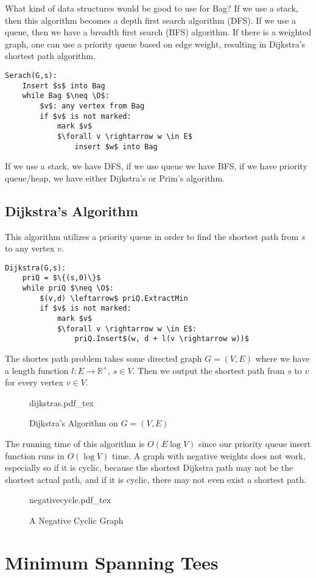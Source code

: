\documentclass{article}
\newcommand{\incfig}[1]{%
    \def\svgwidth{.5\linewidth}
    {#1.pdf_tex}
}
\theoremstyle{definition}
\begin{document}
What kind of data structures would be good to use for Bag? If 
we use a stack, then this algorithm becomes a depth first search algorithm (DFS).
If we use a queue, then we have a breadth first search (BFS) algorithm.
If there is a weighted graph, one can use a priority queue based on edge weight,
resulting in Dijkstra's shortest path algorithm.
\begin{lstlisting}[mathescape=true]
Serach(G,s):
    Insert $s$ into Bag
    while Bag $\neq \O$:
        $v$: any vertex from Bag
        if $v$ is not marked:
            mark $v$
            $\forall v \rightarrow w \in E$
                insert $w$ into Bag
\end{lstlisting}
If we use a stack, we have DFS, if we use queue we have BFS, if we have priority queue/heap, we have
either Dijkstra's or Prim's algorithm.
\subsection*{Dijkstra's Algorithm}
This algorithm utilizes a priority queue in order to find the shortest path from $s$
to any vertex $v$.
\begin{lstlisting}[mathescape=true]
Dijkstra(G,s):
    priQ = $\{(s,0)\}$
    while priQ $\neq \O$:
        $(v,d) \leftarrow$ priQ.ExtractMin
        if $v$ is not marked:
            mark $v$
            $\forall v \rightarrow w \in E$:
                priQ.Insert$(w, d + l(v \rightarrow w))$
\end{lstlisting}
The shortes path problem takes some directed graph $G = (V,E)$ where we have a length function $l: E \rightarrow \mathbb{R}^+$,
$s \in V$. Then we output the shortest path from $s$ to $v$ for every vertex $v \in V$.
\begin{figure}[ht]
    \centering
    \incfig{dijkstras}
    \caption{Dijkstra's Algorithm on $G = (V,E)$}
    \label{fig:dijkstras}
\end{figure}
The running time of this algorithm is $O(E \log V)$ since our priority queue insert function runs in $O(\log V)$ time.
A graph with negative weights does not work, especially so if it is cyclic, because the shortest Dijkstra path may not be 
the shortest actual path, and if it is cyclic, there may not even exist a shortest path.
\begin{figure}[ht]
    \centering
    \incfig{negativecycle}
    \caption{A Negative Cyclic Graph}
    \label{fig:negativecycle}
\end{figure}

\section{Minimum Spanning Tees}
\end{document}
